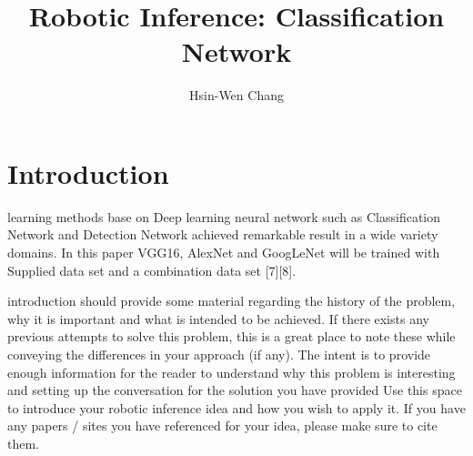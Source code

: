 \documentclass[10pt,journal,compsoc]{IEEEtran}
\begin{document}
\title{Robotic Inference: Classification Network}

\author{Hsin-Wen Chang}

%
{}


\maketitle
\IEEEdisplaynontitleabstractindextext
\IEEEpeerreviewmaketitle
\section{Introduction}
\label{sec:introduction}

 learning methods base on Deep learning neural network such as Classification Network and Detection Network achieved remarkable result in a wide variety domains. 
In this paper VGG16, AlexNet and GoogLeNet will be trained with Supplied data set and a combination data set [7][8]. 

introduction should provide some material regarding the history of the problem, why it is important and what is intended to be achieved. If there exists any previous attempts to solve this problem, this is a great place to note these while conveying the differences in your approach (if any). The intent is to provide enough information for the reader to understand why this problem is interesting and setting up the conversation for the solution you have provided
Use this space to introduce your robotic inference idea and how you wish to apply it. 
If you have any papers / sites you have referenced for your idea, please make sure to cite them.
\end{document}
